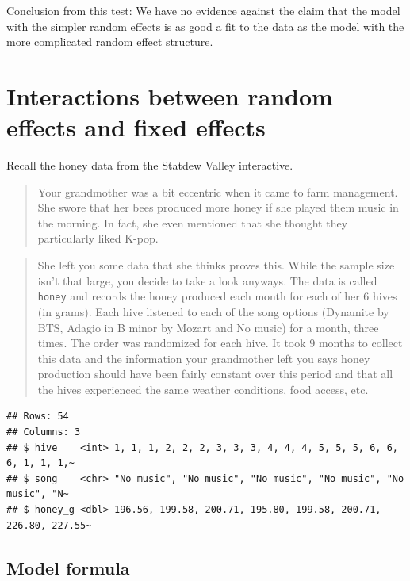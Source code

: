 \documentclass[
  openany]{book}
\begin{document}
Conclusion from this test: We have no evidence against the claim that the model with the simpler random effects is as good a fit to the data as the model with the more complicated random effect structure.

\hypertarget{interactions-between-random-effects-and-fixed-effects}{%
\section{Interactions between random effects and fixed effects}\label{interactions-between-random-effects-and-fixed-effects}}

Recall the honey data from the Statdew Valley interactive.

\begin{quote}
Your grandmother was a bit eccentric when it came to farm management. She swore that her bees produced more honey if she played them music in the morning. In fact, she even mentioned that she thought they particularly liked K-pop.
\end{quote}

\begin{quote}
She left you some data that she thinks proves this. While the sample size isn't that large, you decide to take a look anyways. The data is called \texttt{honey} and records the honey produced each month for each of her 6 hives (in grams). Each hive listened to each of the song options (Dynamite by BTS, Adagio in B minor by Mozart and No music) for a month, three times. The order was randomized for each hive. It took 9 months to collect this data and the information your grandmother left you says honey production should have been fairly constant over this period and that all the hives experienced the same weather conditions, food access, etc.
\end{quote}

\begin{verbatim}
## Rows: 54
## Columns: 3
## $ hive    <int> 1, 1, 1, 2, 2, 2, 3, 3, 3, 4, 4, 4, 5, 5, 5, 6, 6, 6, 1, 1, 1,~
## $ song    <chr> "No music", "No music", "No music", "No music", "No music", "N~
## $ honey_g <dbl> 196.56, 199.58, 200.71, 195.80, 199.58, 200.71, 226.80, 227.55~
\end{verbatim}

\hypertarget{model-formula-2}{%
\subsection{Model formula}\label{model-formula-2}}
\end{document}
